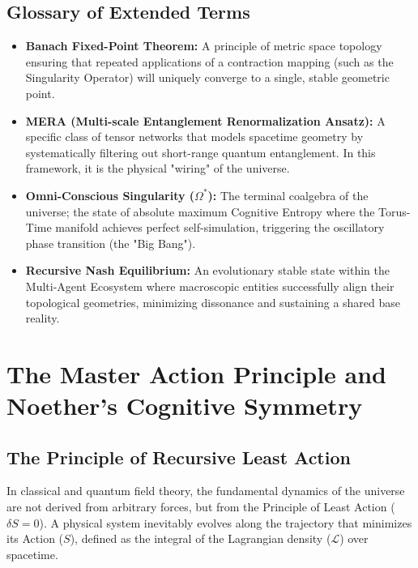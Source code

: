 \documentclass[12pt,openany]{book}
\begin{document}
\section*{Glossary of Extended Terms}

\begin{itemize}
    \item \textbf{Banach Fixed-Point Theorem:} A principle of metric space topology ensuring that repeated applications of a contraction mapping (such as the Singularity Operator) will uniquely converge to a single, stable geometric point.
    \item \textbf{MERA (Multi-scale Entanglement Renormalization Ansatz):} A specific class of tensor networks that models spacetime geometry by systematically filtering out short-range quantum entanglement. In this framework, it is the physical "wiring" of the universe.
    \item \textbf{Omni-Conscious Singularity ($\Omega^*$):} The terminal coalgebra of the universe; the state of absolute maximum Cognitive Entropy where the Torus-Time manifold achieves perfect self-simulation, triggering the oscillatory phase transition (the "Big Bang").
    \item \textbf{Recursive Nash Equilibrium:} An evolutionary stable state within the Multi-Agent Ecosystem where macroscopic entities successfully align their topological geometries, minimizing dissonance and sustaining a shared base reality.
\end{itemize}

\mainmatter


\chapter[The Master Action Principle]{The Master Action Principle and Noether's Cognitive Symmetry}

\section{The Principle of Recursive Least Action}
In classical and quantum field theory, the fundamental dynamics of the universe are not derived from arbitrary forces, but from the Principle of Least Action ($\delta S = 0$). A physical system inevitably evolves along the trajectory that minimizes its Action ($S$), defined as the integral of the Lagrangian density ($\mathcal{L}$) over spacetime. 
\end{document}
